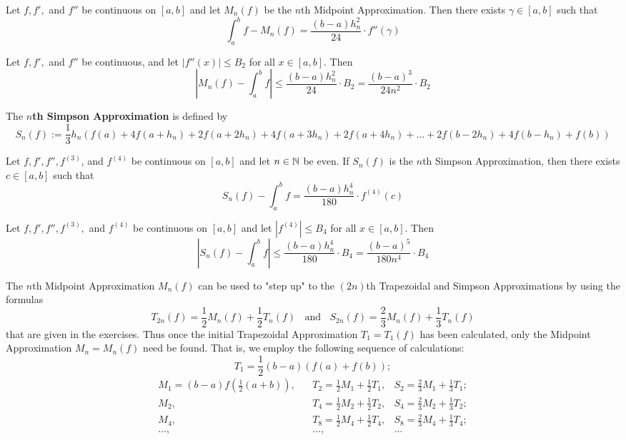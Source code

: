 \begin{theorem}
	Let $f,f',$ and $f''$ be continuous on $[a,b]$ and let $M_n(f)$ be the $n$th Midpoint Approximation. Then there exists $\gamma \in [a,b]$ such that
	\[\displaystyle\int_{a}^{b}f-M_n(f)=\frac{(b-a)h_n^2}{24}\cdot f''(\gamma)\]
\end{theorem}

\begin{corollary}
	Let $f,f',$ and $f''$ be continuous, and let $|f''(x)| \leq B_2$ for all $x \in [a,b]$. Then
	\[\left|M_n(f)-\displaystyle\int_{a}^{b}f\right|\leq \frac{(b-a)h_n^2}{24}\cdot B_2=\frac{(b-a)^3}{24n^2}\cdot B_2\]
\end{corollary}

The \textbf{$n$th Simpson Approximation} is defined by
\[S_n(f):=\frac{1}{3}h_n(f(a)+4f(a+h_n)+2f(a+2h_n)+4f(a+3h_n)+2f(a+4h_n)+\dots+2f(b-2h_n)+4f(b-h_n)+f(b))\]

\begin{theorem}
	Let $f,f',f'',f^{(3)}$, and $f^{(4)}$ be continuous on $[a,b]$ and let $n \in \mathbb{N}$ be even. If $S_n(f)$ is the $n$th Simpson Approximation, then there exists $c \in [a,b]$ such that
	\[S_n(f)-\displaystyle\int_{a}^{b}f=\frac{(b-a)h_n^4}{180}\cdot f^{(4)}(c)\]
\end{theorem}

\begin{corollary}
	Let $f,f',f'',f^{(3)},$ and $f^{(4)}$ be continuous on $[a,b]$ and let $|f^{(4)}| \leq B_4$ for all $x \in [a,b]$. Then
	\[\left|S_n(f)-\displaystyle\int_{a}^{b}f\right|\leq \frac{(b-a)h_n^4}{180}\cdot B_4 = \frac{(b-a)^5}{180n^4}\cdot B_4\]
\end{corollary}

\begin{remark}
	The $n$th Midpoint Approximation $M_n(f)$ can be used to "step up" to the $(2n)$th Trapezoidal and Simpson Approximations by using the formulas
	\[T_{2n}(f)=\frac{1}{2}M_n(f)+\frac{1}{2}T_n(f)\ \ \ \ \text{and}\ \ \ \ S_{2n}(f)=\frac{2}{3}M_n(f)+\frac{1}{3}T_n(f)\]
	that are given in the exercises. Thus once the initial Trapezoidal Approximation $T_1=T_1(f)$ has been calculated, only the Midpoint Approximation $M_n=M_n(f)$ need be found. That is, we employ the following sequence of calculations:
	\[T_1=\frac{1}{2}(b-a)(f(a)+f(b));\]
	\begin{align*}
		M_1=(b-a)f(\frac{1}{2}(a+b)),\ \ \ \  & T_2=\frac{1}{2}M_1+\frac{1}{2}T_1, & S_2=\frac{2}{3}M_1+\frac{1}{3}T_1; \\
		M_2,\ \ \ \                           & T_4=\frac{1}{2}M_2+\frac{1}{2}T_2, & S_4=\frac{2}{3}M_2+\frac{1}{3}T_2; \\
		M_4,\ \ \ \                           & T_8=\frac{1}{2}M_4+\frac{1}{2}T_4, & S_8=\frac{2}{3}M_4+\frac{1}{3}T_4; \\
		\dots,\ \ \ \                         & \dots,                             & \dots
	\end{align*}
\end{remark}
